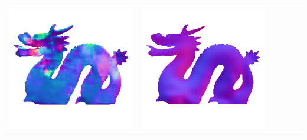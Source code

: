 \begin{center}
\begin{tabularx}{\linewidth}{@{}Y@{}Y@{}Y@{}Y@{}Y@{}Y@{}}
\includegraphics[width=\linewidth]{semisynthetic/20150514_21_marrnet_out.png} &
\includegraphics[width=\linewidth]{semisynthetic/20150514_21_ef_out.png} \\

\end{tabularx}
\end{center}
